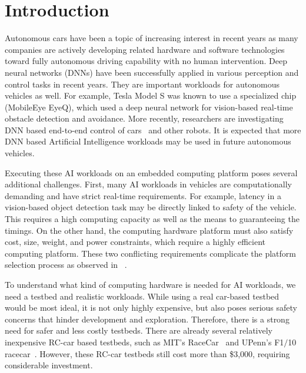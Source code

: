 \section{Introduction} \label{sec:intro}

%
%
Autonomous cars have been a topic of increasing interest in recent
years as many companies are actively developing related hardware
and software technologies toward fully autonomous driving capability with
no human intervention. Deep neural networks (DNNs) have been
successfully applied in various perception and control tasks in
recent years.  They are important workloads for autonomous vehicles
as well. For example, Tesla Model S was known to use a specialized
chip (MobileEye EyeQ), which used a deep neural network for vision-based
real-time obstacle detection and avoidance. More recently, researchers
are investigating DNN based end-to-end control of
cars~\cite{Bojarski2016} and other robots. It is expected that more
DNN based Artificial Intelligence workloads may be used in future
autonomous vehicles.

Executing these AI workloads on an embedded computing platform 
poses several additional challenges. First, many AI workloads in vehicles 
are computationally demanding and have strict real-time requirements. 
For example, latency in a vision-based object
detection task may be directly linked to safety of the vehicle. This
requires a high computing capacity as well as the means to guaranteeing
the timings. On the other hand, the computing hardware platform must
also satisfy cost, size, weight, and power constraints, which require a
highly efficient computing platform. These two conflicting
requirements  complicate the platform selection process as observed in
~\cite{Otterness2017}.


To understand what kind of computing hardware is needed for AI
workloads, we need a testbed and realistic workloads. While using a real 
car-based testbed would be most ideal, it is not only highly expensive, but also
poses serious safety concerns that hinder development and exploration.
Therefore, there is a strong need for safer and less costly
testbeds. There are already several relatively inexpensive RC-car
based testbeds, such as MIT's 
RaceCar~\cite{shin2017project} and UPenn's F1$/$10 racecar~\cite{upennf1tenth}.
However, these RC-car testbeds still cost more than \$3,000, requiring
considerable investment.

